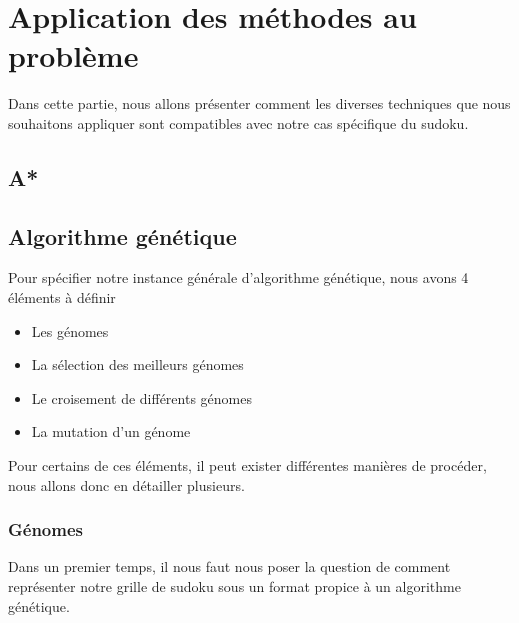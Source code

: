 \chapter{Application des méthodes au problème}

    Dans cette partie, nous allons présenter comment les diverses techniques que nous souhaitons appliquer sont compatibles avec notre cas spécifique du sudoku.
    \section{A*}
    \section{Algorithme génétique}
        Pour spécifier notre instance générale d'algorithme génétique, nous avons 4 éléments à définir
        \begin{itemize}
            \item Les génomes
            \item La sélection des meilleurs génomes
            \item Le croisement de différents génomes
            \item La mutation d'un génome
        \end{itemize}
        Pour certains de ces éléments, il peut exister différentes manières de procéder, nous allons donc en détailler plusieurs.
        \subsection{Génomes}
            Dans un premier temps, il nous faut nous poser la question de comment représenter notre grille de sudoku sous un format propice à un algorithme génétique.\\
